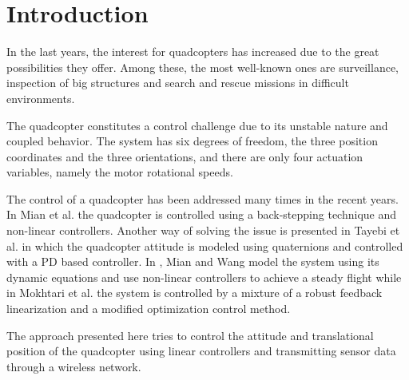 \section{Introduction}
In the last years, the interest for quadcopters has increased due to the great possibilities they offer. Among these, the most well-known ones are surveillance, inspection of big structures and search and rescue missions in difficult environments. \cite{droneuses}

The quadcopter constitutes a control challenge due to its unstable nature and coupled behavior. The system has six degrees of freedom, the three position coordinates and the three orientations, and there are only four actuation variables, namely the motor rotational speeds. \cite{draganflyer} 

The control of a quadcopter has been addressed many times in the recent years. In Mian et al. \cite{backstepping} the quadcopter is controlled using a back-stepping technique and non-linear controllers. Another way of solving the issue is presented in Tayebi et al. \cite{quaternionsPD} in which the quadcopter attitude is modeled using quaternions and controlled with a PD based controller. In \cite{MianWang}, Mian and Wang model the system using its dynamic equations and use non-linear controllers to achieve a steady flight while in Mokhtari et al. \cite{GHinf} the system is controlled by a mixture of a robust feedback linearization and a modified optimization control method.

The approach presented here tries to control the attitude and translational position of the quadcopter using linear controllers and transmitting sensor data through a wireless network. 

